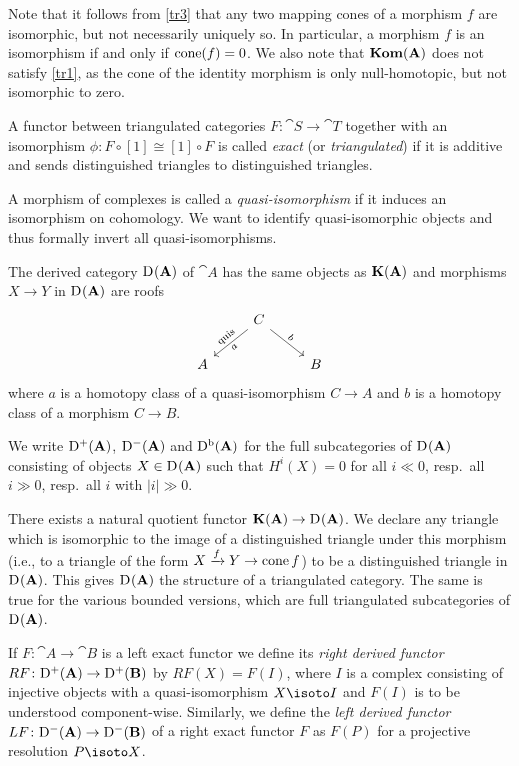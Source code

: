 \documentclass[number-in-sections,a4paper]{notes}
\begin{document}
Note that it follows from \ref{tr3} that any two mapping cones of a morphism $f$ are isomorphic, but not necessarily uniquely so.
In particular, a morphism $f$ is an isomorphism if and only if $\operatorname{cone}(f) = 0$.
We also note that $\mathbf{Kom}(\mathbf A)$ does not satisfy \ref{tr1}, as the cone of the identity morphism is only null-homotopic, but not isomorphic to zero.

A functor between triangulated categories $F\colon \cat S \to \cat T$ together with an isomorphism $\phi\colon F \circ [1] \cong [1] \circ F$ is called \emph{exact} (or \emph{triangulated}) if it is additive and sends distinguished triangles to distinguished triangles.

A morphism of complexes is called a \emph{quasi-isomorphism} if it induces an isomorphism on cohomology.
We want to identify quasi-isomorphic objects and thus formally invert all quasi-isomorphisms.

\begin{Def}
    The derived category $\mathrm{D}^{}(\mathbf A)$ of $\cat A$ has the same objects as $\mathbf{K}(\mathbf A)$ and morphisms $X \to Y$ in $\mathrm{D}^{}(\mathbf A)$ are roofs
    \[
        \begin{tikzcd}
            & C \arrow[dl, "\mathclap{\mathrm{quis}}", sloped, "\mathclap{a}"'] \arrow[dr, "\mathclap{b}", sloped] & \\
            A & & B
        \end{tikzcd}
    \]
    where $a$ is a homotopy class of a quasi-isomorphism $C \to A$ and $b$ is a homotopy class of a morphism $C \to B$.

We write $\mathrm{D}^{+}(\mathbf A)$, $\mathrm{D}^{-}(\mathbf A)$ and $\mathrm{D}^{\mathrm{b}}(\mathbf A)$ for the full subcategories of $\mathrm{D}^{}(\mathbf A)$ consisting of objects $X \in \mathrm{D}^{}(\mathbf A)$ such that $H^i(X) = 0$ for all $i \ll 0$, resp.~all $i \gg 0$, resp.~all $i$ with $|i| \gg 0$.
\end{Def}

There exists a natural quotient functor $\mathbf{K}(\mathbf A) \to \mathrm{D}^{}(\mathbf A)$.
We declare any triangle which is isomorphic to the image of a distinguished triangle under this morphism (i.e., to a triangle of the form $X \xrightarrow{f} Y \to \operatorname{cone}{f}$) to be a distinguished triangle in $\mathrm{D}^{}(\mathbf A)$.
This gives $\mathrm{D}^{}(\mathbf A)$ the structure of a triangulated category.
The same is true for the various bounded versions, which are full triangulated subcategories of $\mathrm{D}^{}(\mathbf A)$.

If $F\colon \cat A \to \cat B$ is a left exact functor we define its \emph{right derived functor} $RF\colon \mathrm{D}^{+}(\mathbf A) \to \mathrm{D}^{+}(\mathbf B)$ by $RF(X) = F(I)$, where $I$ is a complex consisting of injective objects with a quasi-isomorphism $X \isoto I$ and $F(I)$ is to be understood component-wise.
Similarly, we define the \emph{left derived functor} $LF\colon \mathrm{D}^{-}(\mathbf A) \to \mathrm{D}^{-}(\mathbf B)$ of a right exact functor $F$ as $F(P)$ for a projective resolution $P \isoto X$.
\end{document}
